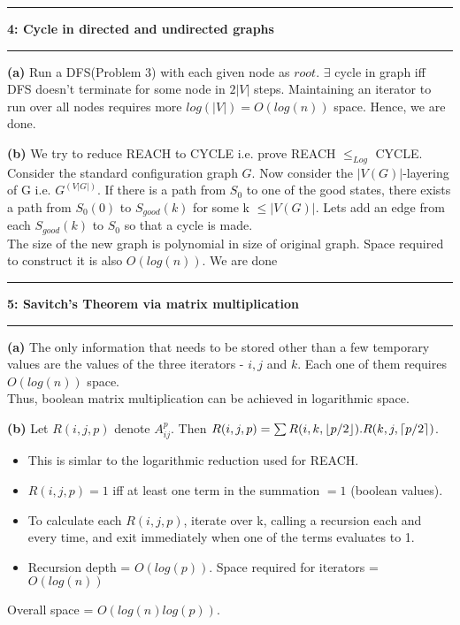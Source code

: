 \documentclass[11pt]{article}
\DeclarePairedDelimiter\ceil{\lceil}{\rceil}
\DeclarePairedDelimiter\floor{\lfloor}{\rfloor}
\newcommand\question[2]{\vspace{.25in}\hrule\textbf{#1: #2}\vspace{.5em}\hrule\vspace{.10in}}
\renewcommand\part[1]{\vspace{.10in}\textbf{(#1)}}
\begin{document}
\newpage

\question{4}{Cycle in directed and undirected graphs}

\part{a}
Run a DFS(Problem 3) with each given node as $root$. $\exists$ cycle in graph iff DFS doesn't terminate for some node in $2|V|$ steps. Maintaining an iterator to run over all nodes requires more $log(|V|) = O(log(n))$ space. Hence, we are done.

\part{b}
We try to reduce REACH to CYCLE i.e. prove REACH ${\leq_{Log}}$ CYCLE. 
Consider the standard configuration graph $G$. Now consider the $|V(G)|$-layering
of G i.e. $G^{(V|G|)}$. If there is a path from $S_0$ to one of the good states,
there exists a path from $S_0(0)$ to $S_{good}(k)$ for some k $\leq |V(G)|$.
Lets add an edge from each $S_{good}(k)$ to $S_0$ so that a cycle is made.\\
\vspace{0.1in}
The size of the new graph is polynomial in size of original graph. Space
required to construct it is also $O(log(n))$. We are done


\question{5}{Savitch’s Theorem via matrix multiplication}
\part{a} The only information that needs to be stored other than a few temporary values are the values of the three iterators - $i, j$ and $k$. Each one of them requires $O(log(n))$ space.\\
Thus, boolean matrix multiplication can be achieved in logarithmic space.

\part{b} Let $R(i, j, p)$ denote $A_{ij}^{p}$. Then $R(i, j, p) = \sum R(i, k, \floor*{p/2}).R(k, j, \ceil*{p/2})$.
\begin{itemize}
\setlength\itemsep{0.01in}
 \item This is simlar to the logarithmic reduction used for REACH. 
 \item $R(i, j, p) = 1$ iff at least one term in the summation $=1$ (boolean values).
 \item To calculate each $R(i, j, p)$, iterate over k, calling a recursion each and every time, and exit immediately when one of the terms evaluates to 1.
 \item Recursion depth = $O(log(p))$. Space required for iterators = $O(log(n))$
\end{itemize}
\vspace{-0.10in}
Overall space = $O(log(n)log(p))$.
\end{document}

